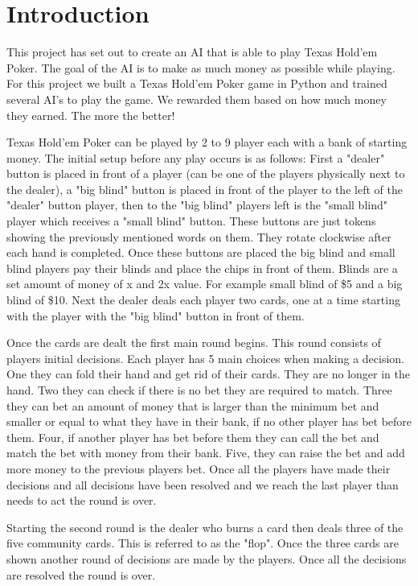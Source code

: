 

\section{Introduction}
This project has set out to create an AI that is able to play Texas Hold'em Poker. The goal of the AI is to make as much money as possible while playing. For this project we built a Texas Hold'em Poker game in Python and trained several AI's to play the game. We rewarded them based on how much money they earned. The more the better!

Texas Hold'em Poker can be played by 2 to 9 player each with a bank of starting money. The initial setup before any play occurs is as follows: First a "dealer" button is placed in front of a player (can be one of the players physically next to the dealer), a "big blind" button is placed in front of the player to the left of the "dealer" button player, then to the "big blind" players left is the "small blind" player which receives a "small blind" button. These buttons are just tokens showing the previously mentioned words on them. They rotate clockwise after each hand is completed. Once these buttons are placed the big blind and small blind players pay their blinds and place the chips in front of them. Blinds are a set amount of money of x and 2x value. For example small blind of \$5 and a big blind of \$10. Next the dealer deals each player two cards, one at a time starting with the player with the "big blind" button in front of them. 

Once the cards are dealt the first main round begins. This round consists of players initial decisions. Each player has 5 main choices when making a decision. One they can fold their hand and get rid of their cards. They are no longer in the hand. Two they can check if there is no bet they are required to match. Three they can bet an amount of money that is larger than the minimum bet and smaller or equal to what they have in their bank, if no other player has bet before them. Four, if another player has bet before them they can call the bet and match the bet with money from their bank. Five, they can raise the bet and add more money to the previous players bet. Once all the players have made their decisions and all decisions have been resolved and we reach the last player than needs to act the round is over. 

Starting the second round is the dealer who burns a card then deals three of the five community cards. This is referred to as the "flop". Once the three cards are shown another round of decisions are made by the players. Once all the decisions are resolved the round is over.

